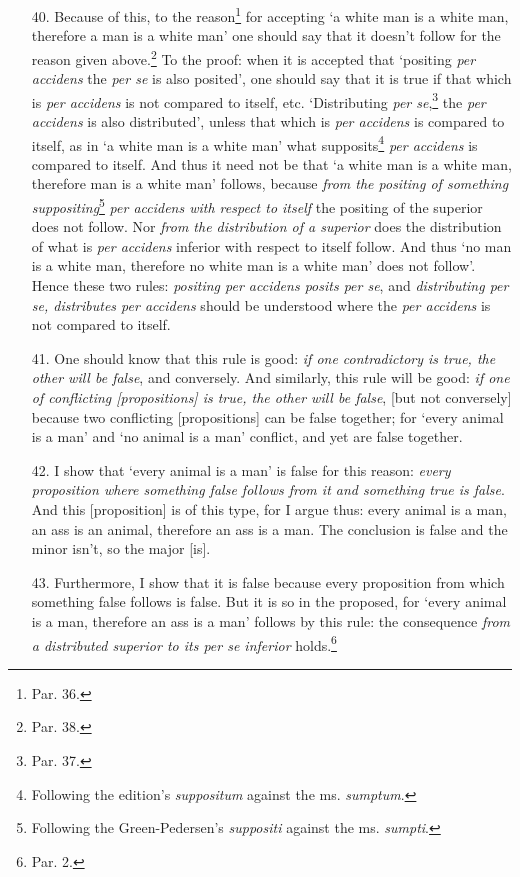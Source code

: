 \begin{enumerate}
\item[40.] Because of this, to the reason\footnote{Par. 36.} for accepting `a white man is a white man, therefore a man is a white man' one should say that it doesn't follow for the reason given above.\footnote{Par. 38.} To the proof: when it is accepted that `positing \textit{per accidens} the \textit{per se} is also posited', one should say that it is true if that which is \textit{per accidens} is not compared to itself, etc. `Distributing \textit{per se},\footnote{Par. 37.} the \textit{per accidens} is also distributed', unless that which is \textit{per accidens} is compared to itself, as in `a white man is a white man' what supposits\footnote{Following the edition's \textit{suppositum} against the ms. \textit{sumptum}.} \textit{per accidens} is compared to itself. And thus it need not be that `a white man is a white man, therefore man is a white man' follows, because \textit{from the positing of something suppositing}\footnote{Following the Green-Pedersen's \textit{suppositi} against the ms. \textit{sumpti}.} \textit{per accidens with respect to itself} the positing of the superior does not follow. Nor \textit{from the distribution of a superior} does the distribution of what is \textit{per accidens} inferior with respect to itself follow. And thus `no man is a white man, therefore no white man is a white man' does not follow'. Hence these two rules: \textit{positing per accidens posits per se}, and \textit{distributing per se, distributes per accidens} should be understood where the \textit{per accidens} is not compared to itself.
\item[41.] One should know that this rule is good: \textit{if one contradictory is true, the other will be false}, and conversely. And similarly, this rule will be good: \textit{if one of conflicting [propositions] is true, the other will be false}, [but not conversely] because two conflicting [propositions] can be false together; for `every animal is a man' and `no animal is a man' conflict, and yet are false together.
\item[42.] I show that `every animal is a man' is false for this reason: \textit{every proposition where something false follows from it and something true is false}. And this [proposition] is of this type, for I argue thus: every animal is a man, an ass is an animal, therefore an ass is a man. The conclusion is false and the minor isn't, so the major [is].
\item[43.] Furthermore, I show that it is false because every proposition from which something false follows is false. But it is so in the proposed, for `every animal is a man, therefore an ass is a man' follows by this rule: the consequence \textit{from a distributed superior to its per se inferior} holds.\footnote{Par. 2.}

\end{enumerate}
